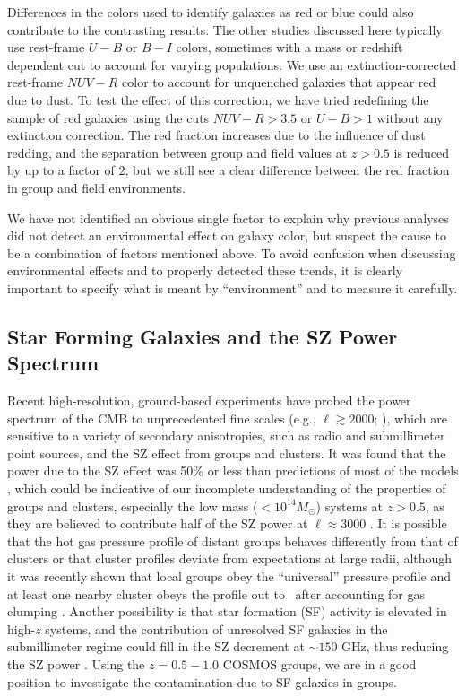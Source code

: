 Differences in the colors used to identify galaxies as red or blue
could also contribute to the contrasting results. The other studies
discussed here typically use rest-frame $U-B$ or $B-I$ colors,
sometimes with a mass or redshift dependent cut to account for varying
populations. We use an extinction-corrected rest-frame $NUV-R$ color
to account for unquenched galaxies that appear red due to dust. To
test the effect of this correction, we have tried redefining the
sample of red galaxies using the cuts $NUV-R>3.5$ or $U-B>1$ without
any extinction correction. The red fraction increases due to the influence of dust
redding, and the separation between group and field values at $z>0.5$
is reduced by up to a factor of $2$, but we still see a clear
difference between the red fraction in group and field environments.

We have not identified an obvious single factor to explain why previous
analyses did not detect an environmental effect on galaxy color, but
suspect the cause to be a combination of factors mentioned above. To
avoid confusion when discussing environmental effects and to properly
detected these trends, it is clearly important to specify what is
meant by ``environment'' and to measure it carefully. 

\subsection{Star Forming Galaxies and the SZ Power Spectrum}

Recent high-resolution, ground-based experiments have probed the power
spectrum of the CMB to unprecedented fine scales (e.g., $\ell \gtrsim 2000$;
\citealt{Lueker2010, Fowler2010, Shirokoff2010, Das2011}), which are
sensitive to a variety of secondary 
anisotropies, such as radio and submillimeter point sources, and the SZ
effect from groups and clusters.  It was found that the power
due to the SZ effect was 50\% or less than predictions of most of the models
\citep{Lueker2010, Dunkley2010}, which could be indicative of our incomplete
understanding of the properties of groups and clusters, especially the low mass
($<10^{14} M_\odot$) systems at $z>0.5$, as they are believed to contribute
half of the SZ power at $\ell\approx 3000$
\citep[e.g.,][]{Komatsu2002, Shaw2010, Trac2011}.  It is possible
that the hot gas pressure profile of distant groups behaves differently from
that of clusters or that cluster profiles deviate from expectations at
large radii, although it was recently shown that local groups obey the
``universal'' pressure profile \citep{Sun2011} and at least one nearby
cluster obeys the profile out to \rvir\ after accounting for gas clumping
\citep{Simionescu2011}.  Another possibility is that star 
formation (SF) activity is elevated in high-$z$ systems, and the contribution
of unresolved SF galaxies in the submillimeter regime could fill in the SZ decrement at $\sim
150$ GHz, thus reducing the SZ power \citep[e.g.,][]{Hall2010}.  Using
the $z=0.5-1.0$ COSMOS groups, we are in a good position to
investigate the contamination due to SF galaxies in groups.

